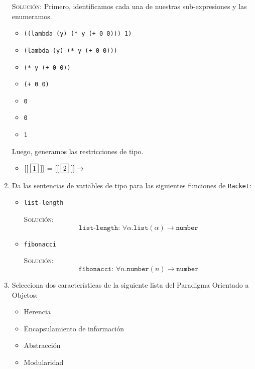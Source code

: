 \documentclass[letterpaper,11pt]{article}
\begin{document}
\begin{enumerate}
    \textsc{Solución:} Primero, identificamos cada una de nuestras 
    sub-expresiones y las enumeramos.
    \begin{itemize}
        \item {} \texttt{((lambda (y) (* y (+ 0 0))) 1)}
        \item {} \texttt{(lambda (y) (* y (+ 0 0)))}
        \item {} \texttt{(* y (+ 0 0))}
        \item {} \texttt{(+ 0 0)}
        \item {} \texttt{0}
        \item {} \texttt{0}
        \item {} \texttt{1}
    \end{itemize}

    Luego, generamos las restricciones de tipo.
    \begin{itemize}
        \item $[[\;\fbox{1}\;]]$ = $[[\;\fbox{2}\;]] \rightarrow$
    \end{itemize}

    \item Da las sentencias de variables de tipo para las siguientes funciones 
    de \texttt{Racket}:
    \begin{itemize}
        \item \texttt{list-length}

        \textsc{Solución:}
        \begin{equation*}
            \texttt{list-length: }\forall \alpha. \texttt{list}(\alpha) 
        \rightarrow \texttt{number}
        \end{equation*}

        \item \texttt{fibonacci}
        
        \textsc{Solución:} 
        \begin{equation*}
            \texttt{fibonacci: } \forall n. \texttt{number}(n) \rightarrow 
            \texttt{number}
        \end{equation*}
    \end{itemize}

    \item Selecciona dos características de la siguiente lista del Paradigma 
    Orientado a Objetos:
    \begin{itemize}
        \item Herencia
        \item Encapsulamiento de información
        \item Abstracción
        \item Modularidad
    \end{itemize}


\end{enumerate}
\end{document}
